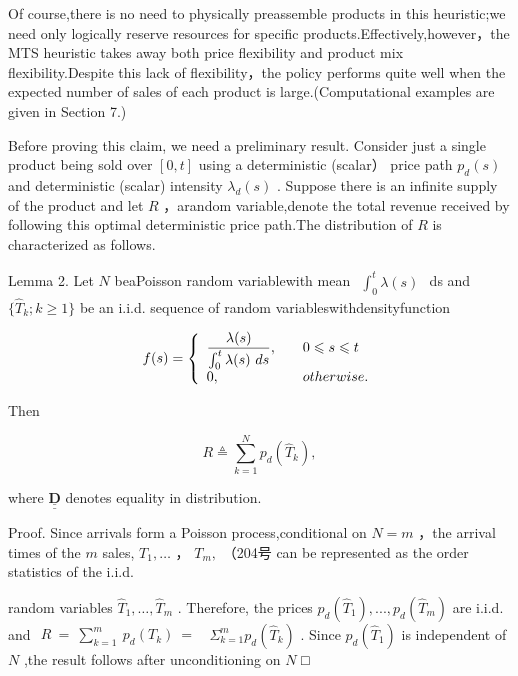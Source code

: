 Of course,there is no need to physically preassemble products in this
heuristic;we need only logically reserve resources for specific
products.Effectively,however，the MTS heuristic takes away both price
flexibility and product mix flexibility.Despite this lack of
flexibility，the policy performs quite well when the expected number of
sales of each product is large.(Computational examples are given in
Section 7.)

Before proving this claim, we need a preliminary result. Consider just a
single product being sold over \([ 0 , t ]\) using a deterministic
(scalar） price path \(p _ { d } ( s )\) and deterministic (scalar)
intensity \(\lambda _ { d } ( s )\) . Suppose there is an infinite
supply of the product and let \(R\) ，arandom variable,denote the total
revenue received by following this optimal deterministic price path.The
distribution of \(R\) is characterized as follows.

Lemma 2. Let \(N\) beaPoisson random variablewith mean
\(\begin{array} { r } { \int _ { 0 } ^ { t } \lambda ( s ) } \end{array}\)
ds and \(\{ \hat { T } _ { k } ; k \ge 1 \}\) be an i.i.d. sequence of
random variableswithdensityfunction

\[
f ( s ) = \left\{ \begin{array} { l l } { \displaystyle \frac { \lambda ( s ) } { \int _ { 0 } ^ { t } \lambda ( s ) ~ d s } , \quad } & { 0 \leqslant s \leqslant t } \\ { 0 , \quad } & { o t h e r w i s e . } \end{array} \right.
\]

Then

\[
R \overset { \vartriangle } { = } \sum _ { k = 1 } ^ { N } p _ { d } ( \hat { T } _ { k } ) ,
\]

where \(\underline { { \underline { { \mathbf { D } } } } }\) denotes
equality in distribution.

Proof. Since arrivals form a Poisson process,conditional on \(N = m\)
，the arrival times of the \(m\) sales, \(T _ { 1 } , \dots\) ，
\(T _ { m } ,\) （204号 can be represented as the order statistics of
the i.i.d.

random variables \(\hat { T } _ { 1 } , \dots , \hat { T } _ { m }\) .
Therefore, the prices
\(p _ { d } ( \hat { T } _ { 1 } ) , . . . , p _ { d } ( \hat { T } _ { m } )\)
are i.i.d. and
\(\begin{array} { r } { R \ = \ \sum _ { k = 1 } ^ { m } \ p _ { d } ( T _ { k } ) \ = \ } \end{array}\)
\(\Sigma _ { k = 1 } ^ { m } p _ { d } ( \hat { T } _ { k } )\) . Since
\(p _ { d } ( \hat { T } _ { 1 } )\) is independent of \(N\) ,the result
follows after unconditioning on \(N\) □


